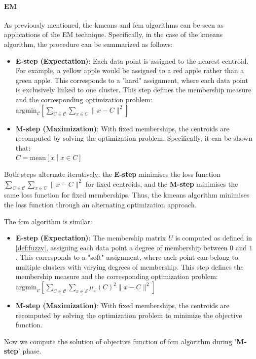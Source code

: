\begin{toReview}
\paragraph{EM} As previously mentioned, the \gls{kmeans} and \gls{fcm} algorithms can be seen as applications of the EM technique. Specifically, in the case of the \gls{kmeans} algorithm, the procedure can be summarized as follows:
\begin{itemize}
	\item \textbf{E-step (Expectation)}: Each data point is assigned to the nearest centroid. For example, a yellow apple would be assigned to a red apple rather than a green apple. This corresponds to a "hard" assignment, where each data point is exclusively linked to one cluster. This step defines the membership measure and the corresponding optimization problem:\\ $\text{argmin}_\mathcal{C}\left[\sum_{C\in\mathcal{C}}\sum_{x \in C}\|x-C\|^2\right]$
	 \item \textbf{M-step (Maximization)}: With fixed memberships, the centroids are recomputed by solving the optimization problem. Specifically, it can be shown that:\\ $C = \text{mean}\left[x\middle|x\in C\right]$
\end{itemize}
\noindent Both steps alternate iteratively: the \textbf{E-step} minimises the loss function \\ $\sum_{C\in\mathcal{C}}\sum_{x \in C}\|x-C\|^2$ for fixed centroids, and the \textbf{M-step} minimises the same loss function for fixed memberships. Thus, the \gls{kmeans} algorithm minimises the loss function through an alternating optimization approach.

\noindent The \gls{fcm} algorithm is similar:
\begin{itemize}
	\item \textbf{E-step (Expectation)}: The membership matrix $U$ is computed as defined in \cref{def:fuzzy}, assigning each data point a degree of membership between $0$ and $1$. This corresponds to a "soft" assignment, where each point can belong to multiple clusters with varying degrees of membership. This step defines the membership measure and the corresponding optimization problem:\\ $\text{argmin}_\mathcal{C}\left[\sum_{C\in\mathcal{C}}\sum_{x \in \mathcal{S}}\mu_x(C)^2\|x-C\|^2\right]$
	\item \textbf{M-step (Maximization)}: With fixed memberships, the centroids are recomputed by solving the optimization problem to minimize the objective function.
\end{itemize}

\bigskip\noindent Now we compute the solution of objective function of \gls{fcm} algorithm during '\textbf{M-step}' phase.
\end{toReview}
